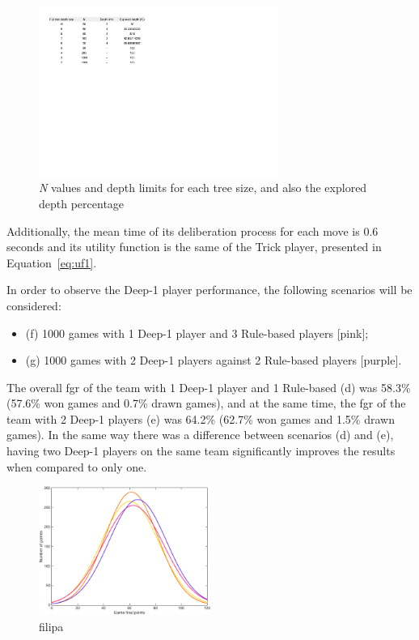 \begin{figure}[h!]
  \centering
    \includegraphics[width=0.7\textwidth]{./img/4/nDepthLimits}
  \caption{\emph{N} values and depth limits for each tree size, and also the explored depth percentage}
\label{fig:nDepthLimits}
\end{figure}
Additionally, the mean time of its deliberation process for each move is 0.6 seconds and its utility function is the same of the Trick player, presented in Equation~\ref{eq:uf1}.

In order to observe the Deep-1 player performance, the following scenarios will be considered:
\begin{itemize}
\item (f) 1000 games with 1 Deep-1 player and 3 Rule-based players [pink];
\item (g) 1000 games with 2 Deep-1 players against 2 Rule-based players [purple].
\end{itemize}

The overall \ac{fgr} of the team with 1 Deep-1 player and 1 Rule-based (d) was 58.3\% (57.6\% won games and 0.7\% drawn games), and at the same time, the \ac{fgr} of the team with 2 Deep-1 players (e) was 64.2\% (62.7\% won games and 1.5\% drawn games).
In the same way there was a difference between scenarios (d) and (e), having two Deep-1 players on the same team significantly improves the results when compared to only one.

\begin{figure}[h!]
  \centering
    \includegraphics[width=0.5\textwidth]{./img/4/DEFG}
  \caption{filipa}
\label{fig:DEFG}
\end{figure}

